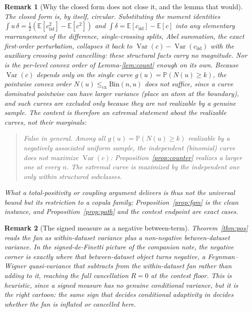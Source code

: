 \documentclass[11pt]{article}
\newtheorem{remark}{Remark}
\begin{document}
\begin{remark}[Why the closed form does not close it, and the lemma that would]
The closed form is, by itself, circular. Substituting the moment identities
$\int u\,\delta=\tfrac12(\mathbb E[c_{\mathrm{iid}}^2]-\mathbb E[c^2])$ and
$\int\delta=\mathbb E[c_{\mathrm{iid}}]-\mathbb E[c]$ into any elementary rearrangement of the
difference, single-crossing splits, Abel summation, the exact first-order perturbation, collapses it
back to $\operatorname{Var}(c)-\operatorname{Var}(c_{\mathrm{iid}})$ with the auxiliary crossing
point cancelling: these structural facts carry no magnitude. Nor is the per-level convex order of
Lemma-\ref{lem:count} enough on its own. Because $\operatorname{Var}(c)$ depends only on the single
curve $g(u)=\mathbb P(N(u)\ge k)$, the pointwise convex order $N(u)\le_{\mathrm{cx}}\mathrm{Bin}(n,u)$
does not suffice, since a curve dominated pointwise can have larger variance (place an atom
at the boundary), and such curves are excluded only because they are not realizable by a genuine
sample. The content is therefore an extremal statement about the realizable curves, not their
marginals:
\begin{quote}
\emph{False in general.} Among all $g(u)=\mathbb P(N(u)\ge k)$ realizable by a negatively associated
uniform sample, the independent (binomial) curve does \emph{not} maximize $\operatorname{Var}(c)$:
Proposition~\ref{prop:counter} realizes a larger one at every $n$. The extremal curve is maximized by
the independent one only within structured subclasses.
\end{quote}
What a total-positivity or coupling argument delivers is thus not the universal bound but its
restriction to a copula family; Proposition~\ref{prop:fgm} is the clean instance, and
Proposition~\ref{prop:path} and the contest endpoint are exact cases.
\end{remark}

\begin{remark}[The signed measure as a negative between-term]
Theorem~\ref{thm:pos} reads the fan as within-dataset variance plus a non-negative between-dataset
variance. In the signed-de-Finetti picture of the companion note, the negative corner is exactly
where that between-dataset object turns negative, a Feynman--Wigner quasi-variance that subtracts from
the within-dataset fan rather than adding to it, reaching the full cancellation $R=0$ at the contest
floor. This is heuristic, since a signed measure has no genuine conditional variance, but it is the
right cartoon: the same sign that decides conditional adaptivity in \citet{cotton_signed} decides
whether the fan is inflated or cancelled here.
\end{remark}
\end{document}
